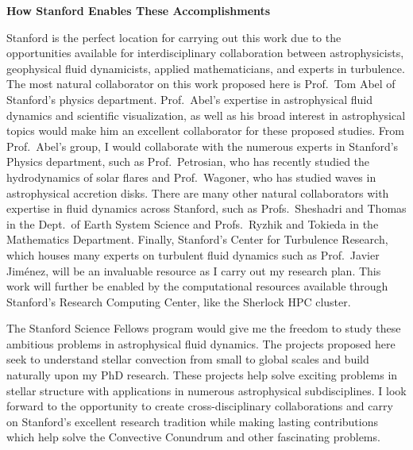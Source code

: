 \documentclass[onecolumn, 11pt, hmargin=1in, vmargin=1in]{aastex62}
\begin{document}
\begin{center}
\vspace{-5pt}
\textbf{How Stanford Enables These Accomplishments}
\vspace{-6pt}
\end{center}
Stanford is the perfect location for carrying out this work due to the opportunities available for interdisciplinary collaboration between astrophysicists, geophysical fluid dynamicists, applied mathematicians, and experts in turbulence.
The most natural collaborator on this work proposed here is Prof.~Tom Abel of Stanford's physics department.
Prof.~Abel's expertise in astrophysical fluid dynamics and scientific visualization, as well as his broad interest in astrophysical topics would make him an excellent collaborator for these proposed studies.
From Prof.~Abel's group, I would collaborate with the numerous experts in Stanford's Physics department, such as Prof.~Petrosian, who has recently studied the hydrodynamics of solar flares and Prof.~Wagoner, who has studied waves in astrophysical accretion disks.
There are many other natural collaborators with expertise in fluid dynamics across Stanford, such as Profs.~Sheshadri and Thomas in the Dept.~of Earth System Science and Profs.~Ryzhik and Tokieda in the Mathematics Department.
Finally, Stanford's Center for Turbulence Research, which houses many experts on turbulent fluid dynamics such as Prof.~Javier Jim\'{e}nez, will be an invaluable resource as I carry out my research plan.
This work will further be enabled by the computational resources available through Stanford's Research Computing Center, like the Sherlock HPC cluster.

The Stanford Science Fellows program would give me the freedom to study these ambitious problems in astrophysical fluid dynamics.
The projects proposed here seek to understand stellar convection from small to global scales and build naturally upon my PhD research.
These projects help solve exciting problems in stellar structure with applications in numerous astrophysical subdisciplines.
I look forward to the opportunity to create cross-disciplinary collaborations and carry on Stanford's excellent research tradition while making lasting contributions which help solve the Convective Conundrum and other fascinating problems. 

\vspace{-22pt}


\end{document}
